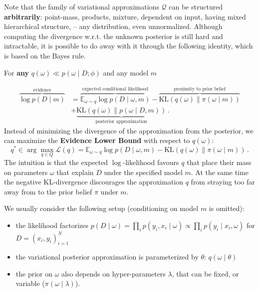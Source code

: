 \documentclass[a4paper,10pt]{article}
\begin{document}
Note that the family of variational approximations $\mathcal{Q}$ can be structured
\textbf{arbitrarily}: point-mass, products, mixture, dependent on input, having mixed hierarchical
structure, -- any distribution, even unnormalized. Although computing the divergence w.r.t.
the unknown posterior is still hard and intractable, it is possible to do away with it
through the following identity, which is based on the Bayes rule.

For \textbf{any} $q(\omega) \ll p(\omega \mid D; \phi)$ and any model $m$

\begin{align}
\overbrace{
  \log p(D \mid m)
}^{\text{evidence}}
  &= \overbrace{
    \mathbb{E}_{\omega \sim q} \log p(D\mid \omega, m)
  }^{\text{expected conditional likelihood}}
  - \overbrace{
    \mathrm{KL}(q(\omega)\| \pi(\omega \mid m))
  }^{\text{proximity to prior belief}}
  \\
  &+ \underbrace{
    \mathrm{KL}(q(\omega)\| p(\omega \mid D, m))
  }_{\text{posterior approximation}}
\,.
\tag{master-identity}
\end{align}
Instead of minimizing the divergence of the approximation from the posterior, we can maximize
the \textbf{Evidence Lower Bound} with respect to $q(\omega)$:
$$
q^* \in
  \arg\max_{q\in Q}
    \mathcal{L}(q)
    = \mathbb{E}_{\omega \sim q} \log p(D\mid \omega, m)
      - \mathrm{KL}(q(\omega)\| \pi(\omega \mid m))
  \,.
  $$
The intuition is that the expected $\log$-likelihood favours $q$ that place their mass on
parameters $\omega$ that explain $D$ under the specified model $m$. At the same time
the negative KL-divergence discourages the approximation $q$ from straying too far away
from to the prior belief $\pi$ under $m$.

We usually consider the following setup (conditioning on model $m$ is omitted):
\begin{itemize}
  \item the likelihood factorizes $
    p(D \mid \omega)
        = \prod_i p(y_i, x_i \mid \omega)
        \propto \prod_i p(y_i \mid x_i, \omega)
  $
  for $D = (x_i, y_i)_{i=1}^N$

  \item the variational posterior approximation is parameterized by $\theta$: $q(\omega \mid \theta)$

  \item the prior on $\omega$ also depends on hyper-parameters $\lambda$, that can be fixed,
  or variable ($\pi(\omega \mid \lambda)$).
\end{itemize}
\end{document}

